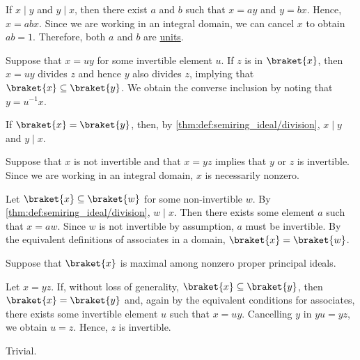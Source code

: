 \begin{defproof}
   If \( x \mid y \) and \( y \mid x \), then there exist \( a \) and \( b \) such that \( x = ay \) and \( y = bx \). Hence, \( x = abx \). Since we are working in an integral domain, we can cancel \( x \) to obtain \( ab = 1 \). Therefore, both \( a \) and \( b \) are \hyperref[def:semiring_divisibility/invertible]{units}.

   Suppose that \( x = uy \) for some invertible element \( u \). If \( z \) is in \( \braket{ x } \), then \( x = uy \) divides \( z \) and hence \( y \) also divides \( z \), implying that \( \braket{ x } \subseteq \braket{ y } \). We obtain the converse inclusion by noting that \( y = u^{-1} x \).

   If \( \braket{ x } = \braket{ y } \), then, by \cref{thm:def:semiring_ideal/division}, \( x \mid y \) and \( y \mid x \).

   Suppose that \( x \) is not invertible and that \( x = yz \) implies that \( y \) or \( z \) is invertible. Since we are working in an integral domain, \( x \) is necessarily nonzero.

  Let \( \braket{ x } \subseteq \braket{ w } \) for some non-invertible \( w \). By \cref{thm:def:semiring_ideal/division}, \( w \mid x \). Then there exists some element \( a \) such that \( x = aw \). Since \( w \) is not invertible by assumption, \( a \) must be invertible. By the equivalent definitions of associates in a domain, \( \braket{ x } = \braket{ w } \).

   Suppose that \( \braket{ x } \) is maximal among nonzero proper principal ideals.

  Let \( x = yz \). If, without loss of generality, \( \braket{ x } \subseteq \braket{ y } \), then \( \braket{ x } = \braket{ y } \) and, again by the equivalent conditions for associates, there exists some invertible element \( u \) such that \( x = uy \). Cancelling \( y \) in \( yu = yz \), we obtain \( u = z \). Hence, \( z \) is invertible.

   Trivial.
\end{defproof}

